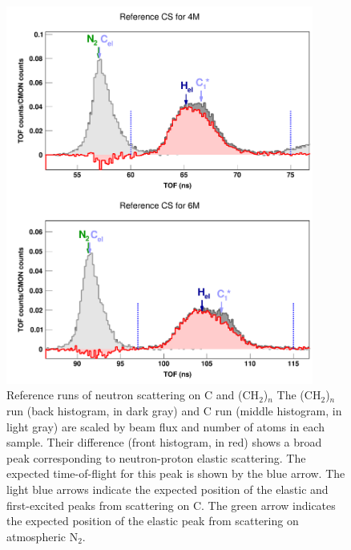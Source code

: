 \begin{figure}[ht!]
    \centering
    \includegraphics[width = 0.9\textwidth]{figures/ECSReferenceRuns.png}
    \caption[Reference runs of neutron scattering on C and (CH$_{2}$)$_{n}$]
    {
        Reference runs of neutron scattering on C and (CH$_{2}$)$_{n}$
        The (CH$_{2}$)$_{n}$ run (back histogram, in dark gray) and C run
        (middle histogram, in light gray) are scaled by beam flux and number of
        atoms in each sample. Their difference (front histogram, in red) shows a
        broad peak corresponding to neutron-proton elastic scattering. The
        expected time-of-flight for this peak is shown by the blue arrow. The light blue arrows 
        indicate the expected position of the elastic and first-excited peaks
        from scattering on C. The green arrow indicates the expected position of
        the elastic peak from scattering on atmospheric N$_{2}$.
    }
    \label{ECSReferenceRuns}
\end{figure}

